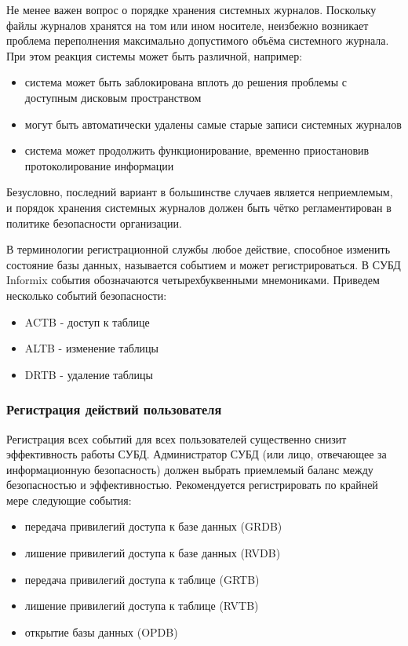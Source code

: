 Не менее важен вопрос о порядке хранения системных журналов. Поскольку файлы журналов хранятся на
том или ином носителе, неизбежно возникает проблема переполнения максимально допустимого объёма
системного журнала. При этом реакция системы может быть различной, например:
\begin{itemize}
    \item система может быть заблокирована вплоть до решения проблемы с доступным дисковым пространством
    \item могут быть автоматически удалены самые старые записи системных журналов
    \item система может продолжить функционирование, временно приостановив протоколирование информации
\end{itemize}

Безусловно, последний вариант в большинстве случаев является неприемлемым, и порядок хранения
системных журналов должен быть чётко регламентирован в политике безопасности организации.

В терминологии регистрационной службы любое действие, способное изменить состояние базы данных,
называется событием и может регистрироваться. В СУБД Informix события обозначаются
четырехбуквенными мнемониками. Приведем несколько событий безопасности:
\begin{itemize}
    \item ACTB - доступ к таблице
    \item ALTB - изменение таблицы
    \item DRTB - удаление таблицы
\end{itemize}


\subsubsection{Регистрация действий пользователя}
Регистрация всех событий для всех пользователей существенно снизит эффективность работы СУБД.
Администратор СУБД (или лицо, отвечающее за информационную безопасность) должен выбрать приемлемый
баланс между безопасностью и эффективностью.
Рекомендуется регистрировать по крайней мере следующие события:
\begin{itemize}
    \item передача привилегий доступа к базе данных (GRDB)
    \item лишение привилегий доступа к базе данных (RVDB)
    \item передача привилегий доступа к таблице (GRTB)
    \item лишение привилегий доступа к таблице (RVTB)
    \item открытие базы данных (OPDB)
\end{itemize}

